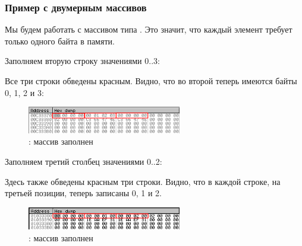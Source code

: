 \subsubsection{Пример с двумерным массивов}

Мы будем работать с массивом типа \Tchar. Это значит, что каждый элемент требует
только одного байта в памяти.

\myindex{\olly}

Заполняем вторую строку значениями 0..3:



Все три строки обведены красным. 
Видно, что во второй теперь имеются байты 0, 1, 2 и 3:

\begin{figure}[H]
\centering
\ifdefined\ebook
{}
\else
\includegraphics[width=0.6\textwidth]{patterns/13_arrays/5_multidimensional/olly_2D_1.png}
\fi
\caption{\olly: массив заполнен}
\end{figure}

\myindex{\olly}

Заполняем третий столбец значениями 0..2:



Здесь также обведены красным три строки. 
Видно, что в каждой строке, на третьей позиции, теперь записаны 0, 1 и 2.

\begin{figure}[H]
\centering
\includegraphics[width=0.6\textwidth]{patterns/13_arrays/5_multidimensional/olly_2D_2.png}
\caption{\olly: массив заполнен}
\end{figure}
